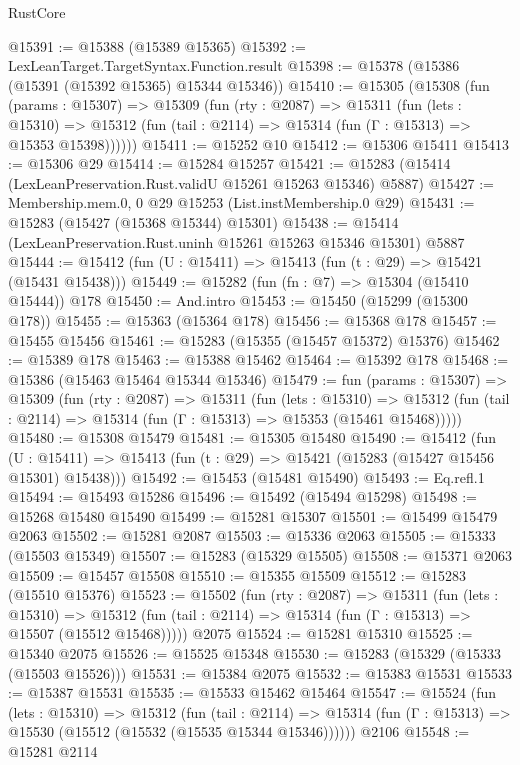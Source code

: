 \begin{lexlean}{RustCore}
\begin{coremodule}
@15391 := @15388 (@15389 @15365)
@15392 := LexLeanTarget.TargetSyntax.Function.result
@15398 := @15378 (@15386 (@15391 (@15392 @15365) @15344 @15346))
@15410 := @15305
    (@15308
      (fun (params : @15307) =>
      @15309
        (fun (rty : @2087) =>
        @15311
          (fun (lets : @15310) =>
          @15312 (fun (tail : @2114) => @15314 (fun (Γ : @15313) => @15353 @15398))))))
@15411 := @15252 @10
@15412 := @15306 @15411
@15413 := @15306 @29
@15414 := @15284 @15257
@15421 := @15283 (@15414 (LexLeanPreservation.Rust.validU @15261 @15263 @15346) @5887)
@15427 := Membership.mem.{0, 0} @29 @15253 (List.instMembership.{0} @29)
@15431 := @15283 (@15427 (@15368 @15344) @15301)
@15438 := @15414 (LexLeanPreservation.Rust.uninh @15261 @15263 @15346 @15301) @5887
@15444 := @15412 (fun (U : @15411) => @15413 (fun (t : @29) => @15421 (@15431 @15438)))
@15449 := @15282 (fun (fn : @7) => @15304 (@15410 @15444)) @178
@15450 := And.intro
@15453 := @15450 (@15299 (@15300 @178))
@15455 := @15363 (@15364 @178)
@15456 := @15368 @178
@15457 := @15455 @15456
@15461 := @15283 (@15355 (@15457 @15372) @15376)
@15462 := @15389 @178
@15463 := @15388 @15462
@15464 := @15392 @178
@15468 := @15386 (@15463 @15464 @15344 @15346)
@15479 := fun (params : @15307) =>
  @15309
    (fun (rty : @2087) =>
    @15311
      (fun (lets : @15310) =>
      @15312 (fun (tail : @2114) => @15314 (fun (Γ : @15313) => @15353 (@15461 @15468)))))
@15480 := @15308 @15479
@15481 := @15305 @15480
@15490 := @15412
    (fun (U : @15411) => @15413 (fun (t : @29) => @15421 (@15283 (@15427 @15456 @15301) @15438)))
@15492 := @15453 (@15481 @15490)
@15493 := Eq.refl.{1}
@15494 := @15493 @15286
@15496 := @15492 (@15494 @15298)
@15498 := @15268 @15480 @15490
@15499 := @15281 @15307
@15501 := @15499 @15479 @2063
@15502 := @15281 @2087
@15503 := @15336 @2063
@15505 := @15333 (@15503 @15349)
@15507 := @15283 (@15329 @15505)
@15508 := @15371 @2063
@15509 := @15457 @15508
@15510 := @15355 @15509
@15512 := @15283 (@15510 @15376)
@15523 := @15502
    (fun (rty : @2087) =>
    @15311
      (fun (lets : @15310) =>
      @15312 (fun (tail : @2114) => @15314 (fun (Γ : @15313) => @15507 (@15512 @15468)))))
    @2075
@15524 := @15281 @15310
@15525 := @15340 @2075
@15526 := @15525 @15348
@15530 := @15283 (@15329 (@15333 (@15503 @15526)))
@15531 := @15384 @2075
@15532 := @15383 @15531
@15533 := @15387 @15531
@15535 := @15533 @15462 @15464
@15547 := @15524
    (fun (lets : @15310) =>
    @15312
      (fun (tail : @2114) =>
      @15314 (fun (Γ : @15313) => @15530 (@15512 (@15532 (@15535 @15344 @15346))))))
    @2106
@15548 := @15281 @2114

\end{coremodule}
\end{lexlean}
